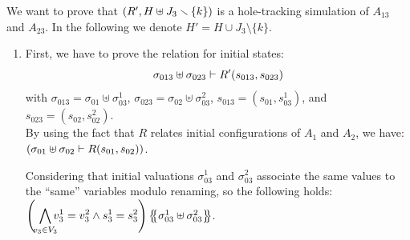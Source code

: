 \documentclass[runningheads]{llncs}
\begin{document}

We want to prove that ${\left(R', H\uplus J_3 \smallsetminus\{k\}\right)}$ is a hole-tracking simulation of $A_{13}$ and $A_{23}$. In the following we denote $H'=H\cup J_3 \setminus\{k\}$.
\begin{enumerate}
\item First, we have to prove the relation for initial states:
\[\sigma_{013} \uplus \sigma_{023} \vdash R'{\left(s_{013}, s_{023}\right)}\]
with $\sigma_{013} = \sigma_{01} \uplus \sigma_{03}^1$, $\sigma_{023} = \sigma_{02} \uplus \sigma_{03}^2$, $s_{013}=(s_{01},s_{03}^1)$, and $s_{023}=(s_{02},s_{02}^2)$.\\
By using the fact that $R$ relates initial configurations of  $A_1$ and $A_2$, we have:
${\left(\sigma_{01} \uplus \sigma_{02} \vdash R{\left(s_{01}, s_{02}\right)}\right)}$.  

Considering that initial valuations $\sigma_{03}^1$ and $\sigma_{03}^2$ associate the same values to the ``same'' variables modulo renaming, so the following holds:\\ $\left(\,\,{\displaystyle \bigwedge_\subbox{v_3\in V_3} v^1_3=v^2_3\wedge s^1_3 = s^2_3}\right)\psubst{\sigma_{03}^1 \uplus \sigma_{03}^2 }$.


\end{enumerate}
\end{document}
